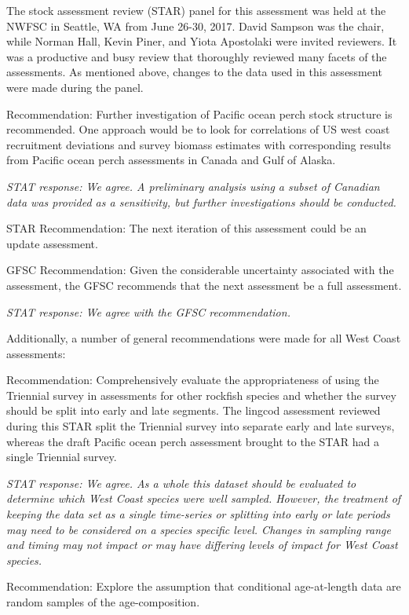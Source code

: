 \documentclass[12pt,]{article}
\begin{document}
The stock assessment review (STAR) panel for this assessment was held at
the NWFSC in Seattle, WA from June 26-30, 2017. David Sampson was the
chair, while Norman Hall, Kevin Piner, and Yiota Apostolaki were invited
reviewers. It was a productive and busy review that thoroughly reviewed
many facets of the assessments. As mentioned above, changes to the data
used in this assessment were made during the panel.

Recommendation: Further investigation of Pacific ocean perch stock
structure is recommended. One approach would be to look for correlations
of US west coast recruitment deviations and survey biomass estimates
with corresponding results from Pacific ocean perch assessments in
Canada and Gulf of Alaska.

\emph{STAT response: We agree. A preliminary analysis using a subset of
Canadian data was provided as a sensitivity, but further investigations
should be conducted.}

STAR Recommendation: The next iteration of this assessment could be an
update assessment.

GFSC Recommendation: Given the considerable uncertainty associated with
the assessment, the GFSC recommends that the next assessment be a full
assessment.

\emph{STAT response: We agree with the GFSC recommendation.}

Additionally, a number of general recommendations were made for all West
Coast assessments:

Recommendation: Comprehensively evaluate the appropriateness of using
the Triennial survey in assessments for other rockfish species and
whether the survey should be split into early and late segments. The
lingcod assessment reviewed during this STAR split the Triennial survey
into separate early and late surveys, whereas the draft Pacific ocean
perch assessment brought to the STAR had a single Triennial survey.

\emph{STAT response: We agree. As a whole this dataset should be
evaluated to determine which West Coast species were well sampled.
However, the treatment of keeping the data set as a single time-series
or splitting into early or late periods may need to be considered on a
species specific level. Changes in sampling range and timing may not
impact or may have differing levels of impact for West Coast species.}

Recommendation: Explore the assumption that conditional age-at-length
data are random samples of the age-composition.
\end{document}
